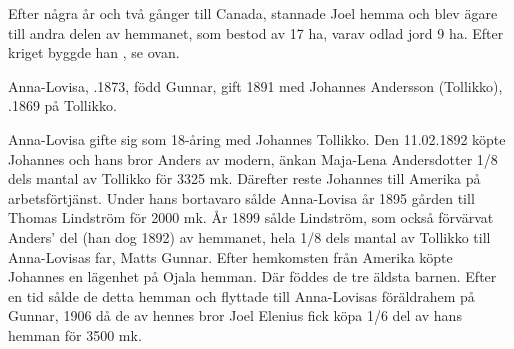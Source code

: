 %
Efter några år och två gånger till Canada, stannade Joel hemma och blev ägare till andra delen av hemmanet, som bestod av 17 ha, varav odlad jord 9 ha. Efter kriget byggde han , se ovan.



%


%
Anna-Lovisa, .1873, född Gunnar, gift 1891 med Johannes Andersson (Tollikko), .1869 på Tollikko.
\begin{jhchildren}
  \item {}
  \item {}
  \item {}
  \item {}
  \item {}
  \item {}
  \item {}
  \item {}
  \item {}
  \item {}
\end{jhchildren}


Anna-Lovisa gifte sig som 18-åring med Johannes Tollikko. Den 11.02.1892 köpte Johannes och hans bror Anders av modern, änkan Maja-Lena Andersdotter 1/8 dels mantal av Tollikko för 3325 mk. Därefter reste Johannes till Amerika på arbetsförtjänst. Under hans bortavaro sålde Anna-Lovisa år 1895 gården till Thomas Lindström för 2000 mk. År 1899 sålde Lindström, som också förvärvat Anders' del (han dog 1892) av hemmanet, hela 1/8 dels mantal av Tollikko till Anna-Lovisas far, Matts Gunnar.
Efter hemkomsten från Amerika köpte Johannes en lägenhet på Ojala hemman. Där föddes de tre äldsta barnen. Efter en tid sålde de detta hemman och flyttade till Anna-Lovisas föräldrahem på Gunnar, 1906 då de av hennes bror Joel Elenius fick köpa 1/6 del av hans hemman för 3500 mk.

